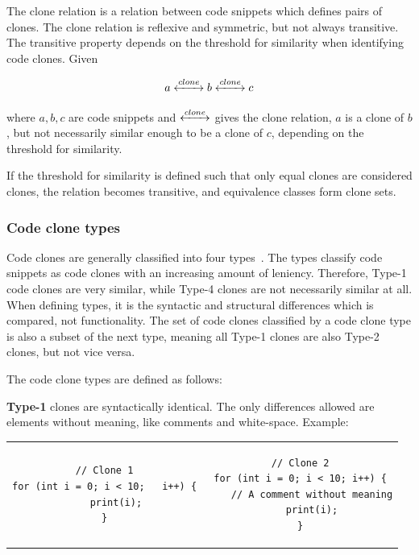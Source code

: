 The clone relation is a relation between code snippets which defines pairs of clones.
The clone relation is reflexive and symmetric, but not always transitive. The transitive
property depends on the threshold for similarity when identifying code clones. Given

$$a \xleftrightarrow{clone} b \xleftrightarrow{clone} c$$


where $a,b,c$ are code snippets and $\xleftrightarrow{clone}$ gives the clone relation, $a$ is
a clone of $b$, but not necessarily similar enough to be a clone of $c$, depending on the
threshold for similarity.

If the threshold for similarity is defined such that only equal clones are considered
clones, the relation becomes transitive, and equivalence classes form clone sets.

\subsubsection{Code clone types}

Code clones are generally classified into four types~\cite{Inoue_introduction_to_cc}. The
types classify code snippets as code clones with an increasing amount of leniency.
Therefore, Type-1 code clones are very similar, while Type-4 clones are not necessarily
similar at all. When defining types, it is the syntactic and structural differences which
is compared, not functionality. The set of code clones classified by a code clone type
is also a subset of the next type, meaning all Type-1 clones are also Type-2 clones, but
not vice versa.

The code clone types are defined as follows:

\textbf{Type-1} clones are syntactically identical. The only differences allowed are elements
without meaning, like comments and white-space. Example:

\begin{tcolorbox}
	\begin{center}
		\begin{tabular}{c | c}
			\begin{lstlisting}
// Clone 1
for (int i = 0; i < 10;   i++) {
    print(i);
}
        \end{lstlisting} &
			\begin{lstlisting}
// Clone 2
for (int i = 0; i < 10; i++) {
    // A comment without meaning
    print(i);
}
        \end{lstlisting}
		\end{tabular}
	\end{center}
\end{tcolorbox}




